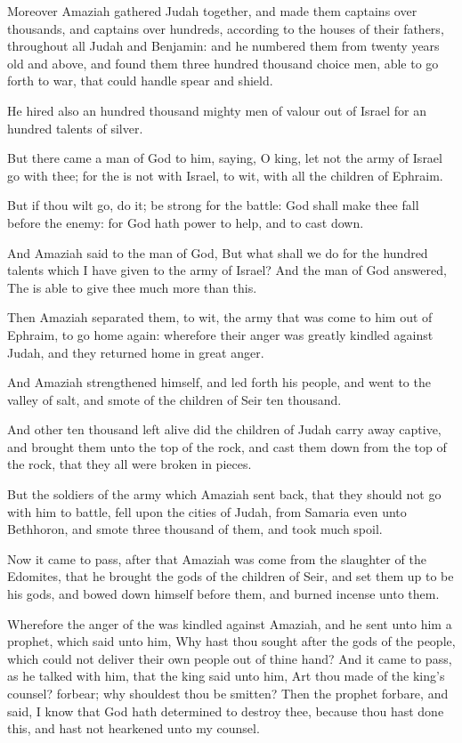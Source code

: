 \verse Moreover Amaziah gathered Judah together, and made them captains over thousands, and captains over hundreds, according to the houses of their fathers, throughout all Judah and Benjamin: and he numbered them from twenty years old and above, and found them three hundred thousand choice men, able to go forth to war, that could handle spear and shield.

\verse He hired also an hundred thousand mighty men of valour out of Israel for an hundred talents of silver.

\verse But there came a man of God to him, saying, O king, let not the army of Israel go with thee; for the \LORD is not with Israel, to wit, with all the children of Ephraim.

\verse But if thou wilt go, do it; be strong for the battle: God shall make thee fall before the enemy: for God hath power to help, and to cast down.

\verse And Amaziah said to the man of God, But what shall we do for the hundred talents which I have given to the army of Israel? And the man of God answered, The \LORD is able to give thee much more than this.

\verse Then Amaziah separated them, to wit, the army that was come to him out of Ephraim, to go home again: wherefore their anger was greatly kindled against Judah, and they returned home in great anger.

\verse And Amaziah strengthened himself, and led forth his people, and went to the valley of salt, and smote of the children of Seir ten thousand.

\verse And other ten thousand left alive did the children of Judah carry away captive, and brought them unto the top of the rock, and cast them down from the top of the rock, that they all were broken in pieces.

\verse But the soldiers of the army which Amaziah sent back, that they should not go with him to battle, fell upon the cities of Judah, from Samaria even unto Bethhoron, and smote three thousand of them, and took much spoil.

\verse Now it came to pass, after that Amaziah was come from the slaughter of the Edomites, that he brought the gods of the children of Seir, and set them up to be his gods, and bowed down himself before them, and burned incense unto them.

\verse Wherefore the anger of the \LORD was kindled against Amaziah, and he sent unto him a prophet, which said unto him, Why hast thou sought after the gods of the people, which could not deliver their own people out of thine hand?  \verse And it came to pass, as he talked with him, that the king said unto him, Art thou made of the king's counsel?  forbear; why shouldest thou be smitten? Then the prophet forbare, and said, I know that God hath determined to destroy thee, because thou hast done this, and hast not hearkened unto my counsel.

